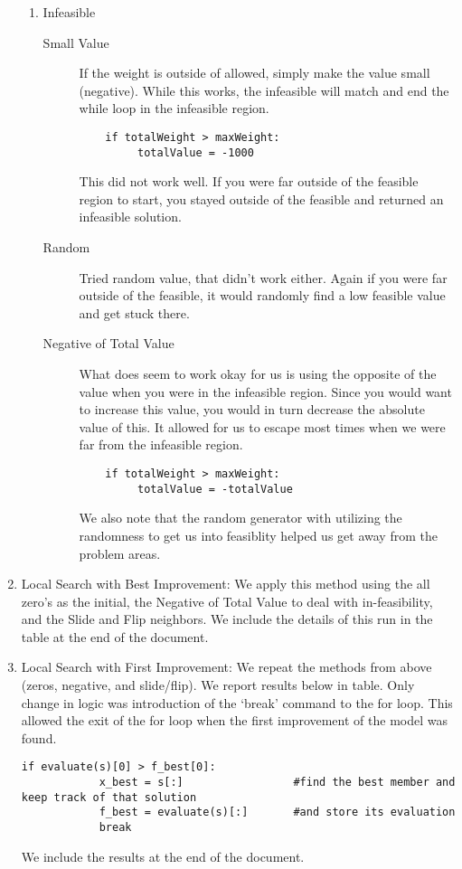 \documentclass[11pt]{article}
\begin{document}
\begin{enumerate}
\begin{enumerate}
\item Infeasible
\begin{description}
\item [Small Value]  If the weight is outside of allowed, simply make the value small (negative). While this works, the infeasible will match and end the while loop in the infeasible region.
\begin{verbatim}
    if totalWeight > maxWeight:
         totalValue = -1000
\end{verbatim}
This did not work well.  If you were far outside of the feasible region to start, you stayed outside of the feasible and returned an infeasible solution.  
\item [Random] Tried random value, that didn't work either.  Again if you were far outside of the feasible, it would randomly find a low feasible value and get stuck there.  
\item [Negative of Total Value]    What does seem to work okay for us is using the opposite of the value when you were in the infeasible region.  Since you would want to increase this value, you would in turn decrease the absolute value of this.  It allowed for us to escape most times when we were far from the infeasible region.
\begin{verbatim}
    if totalWeight > maxWeight:
         totalValue = -totalValue
\end{verbatim}
We also note that the random generator with utilizing the randomness to get us into feasiblity helped us get away from the problem areas.
\end{description}
\end{enumerate}
\item Local Search with Best Improvement:  We apply this method using the all zero's as the initial, the Negative of Total Value to deal with in-feasibility, and the Slide and Flip neighbors.
We include the details of this run in the table at the end of the document.

\item Local Search with First Improvement:  We repeat the methods from above (zeros, negative, and slide/flip).  We report results below in table.  Only change in logic was introduction of the `break' command to the for loop.  This allowed the exit of the for loop when the first improvement of the model was found. 
\begin{verbatim}
if evaluate(s)[0] > f_best[0]:
            x_best = s[:]                 #find the best member and keep track of that solution
            f_best = evaluate(s)[:]       #and store its evaluation
            break
\end{verbatim}
We include the results at the end of the document.


\end{enumerate}
\end{document}
